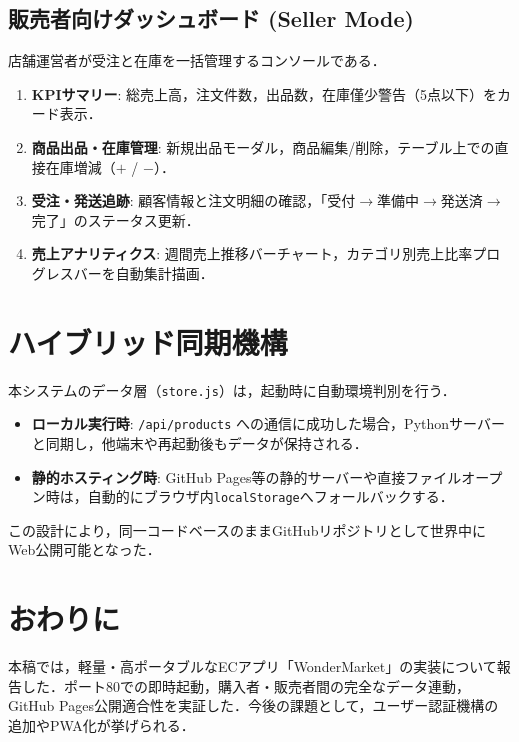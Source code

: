 \documentclass[a4paper,twocolumn,9pt]{bxjsarticle}
\begin{document}
\subsection{販売者向けダッシュボード (Seller Mode)}
店舗運営者が受注と在庫を一括管理するコンソールである．
\begin{enumerate}
  \item \textbf{KPIサマリー}: 総売上高，注文件数，出品数，在庫僅少警告（5点以下）をカード表示．
  \item \textbf{商品出品・在庫管理}: 新規出品モーダル，商品編集/削除，テーブル上での直接在庫増減（$+$ / $-$）．
  \item \textbf{受注・発送追跡}: 顧客情報と注文明細の確認，「受付$\rightarrow$準備中$\rightarrow$発送済$\rightarrow$完了」のステータス更新．
  \item \textbf{売上アナリティクス}: 週間売上推移バーチャート，カテゴリ別売上比率プログレスバーを自動集計描画．
\end{enumerate}

\section{ハイブリッド同期機構}
本システムのデータ層（\texttt{store.js}）は，起動時に自動環境判別を行う．
\begin{itemize}
  \item \textbf{ローカル実行時}: \texttt{/api/products} への通信に成功した場合，Pythonサーバーと同期し，他端末や再起動後もデータが保持される．
  \item \textbf{静的ホスティング時}: GitHub Pages等の静的サーバーや直接ファイルオープン時は，自動的にブラウザ内\texttt{localStorage}へフォールバックする．
\end{itemize}
この設計により，同一コードベースのままGitHubリポジトリとして世界中にWeb公開可能となった．

\section{おわりに}
本稿では，軽量・高ポータブルなECアプリ「WonderMarket」の実装について報告した．ポート80での即時起動，購入者・販売者間の完全なデータ連動，GitHub Pages公開適合性を実証した．今後の課題として，ユーザー認証機構の追加やPWA化が挙げられる．
\end{document}
